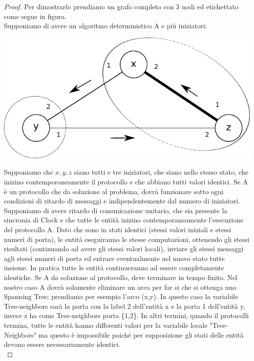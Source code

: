 \begin{proof}
    Per dimostrarlo prendiamo un grafo completo con 3 nodi ed etichettato come
    segue in figura.\\
    Supponiamo di avere un algoritmo deterministico A e più iniziatori:
    \begin{center}
        \includegraphics[scale=0.8]{images/n_37}
    \end{center}

    Supponiamo che $x, y, z$ siano tutti e tre iniziatori, che siano nello
    stesso stato, che inizino contemporaneamente il protocollo e che abbiano
    tutti valori identici. Se A è un protocollo che da soluzione al problema,
    dovrà funzionare sotto ogni condizioni di ritardo di messaggi e
    indipendentemente dal numero di iniziatori. Supponiamo di avere ritardo di
    comunicazione unitario, che sia presente la sincronia di Clock e che tutte
    le entità inizino contemporaneamente l'esecuzione del protocollo A. Dato che
    sono in stati identici (stessi valori iniziali e stessi numeri di porta), le
    entità eseguiranno le stesse computazioni, ottenendo gli stessi risultati
    (continuando ad avere gli stessi valori locali), inviare gli stessi messaggi
    agli stessi numeri di porta ed entrare eventualmente nel nuovo stato tutte
    insieme. In pratica tutte le entità continueranno ad essere completamente
    identiche. Se A da soluzione al protocollo, deve terminare in tempo finito.
    Nel nostro caso A dovrà solamente eliminare un arco per far si che si
    ottenga uno Spanning Tree; prendiamo per esempio l'arco (x,y). In questo
    caso la variabile Tree-neighbors sarà la porta con la label 2 dell'entità x e
    la porta 1 dell'entità y, invece z ha come Tree-neighbors porta \{1,2\}. In
    altri termini, quando il protocolli termina, tutte le entità hanno
    differenti valori per la variabile locale "Tree-Neighbors" ma questo è
    impossibile poiché per supposizione gli stati delle entità devono essere
    necessariamente identici.\\


\end{proof}

